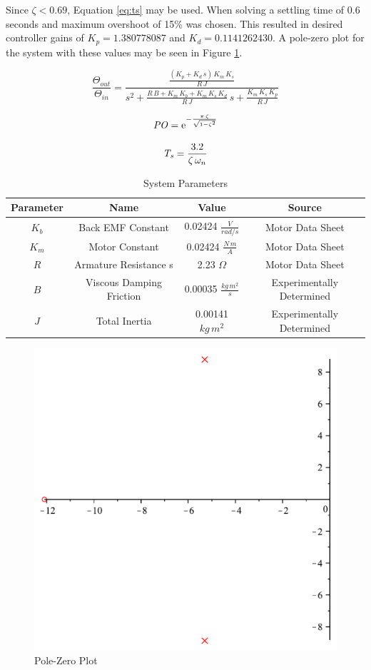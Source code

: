 Since $\zeta < 0.69$, Equation \ref{eq:ts} may be used.
When solving a settling time of 0.6 seconds and maximum overshoot of 15\% was chosen.
This resulted in desired controller gains of $K_p = 1.380778087$ and $ K_d = 0.1141262430 $.
A pole-zero plot for the system with these values may be seen in Figure \ref{fig:polezero}.

\begin{equation}
	\label{eq:systf}
	{\frac {\Theta_{out}}{\Theta_{in}}} = 
	{\frac 
		{\frac {\left( K_p +  K_d\,s \right)\,K_m\,K_s}{R\,J}}
		{s^{2} + {\frac {R\,B + K_m\,K_b + K_m\,K_s\,K_d}{R\,J}}\,s + {\frac {K_m\,K_s\,K_p}{R\,J}}}
	}
\end{equation}

\begin{equation}
	\label{eq:po}
	{\it PO}={{\rm e}^{-{\frac {\pi \,\zeta}{\sqrt {1-{\zeta}^{2}}}}}}
\end{equation}

\begin{equation}
	\label{eq:ts}
	{\it T_s} ={\frac {3.2}{\zeta\,\omega_n}}
\end{equation}

\begin{table}[htb]
	\centering
	\caption{System Parameters}
	\label{tbl:sysparams}
	\vspace{6pt}
	\footnotesize
	\begin{tabular}{cccc}
		\toprule
		Parameter & Name & Value & Source \\
		\midrule
		$K_b$ & Back EMF Constant & 0.02424 ${\frac {V}{rad/s}}$ & Motor Data Sheet \\
		$K_m$ & Motor Constant & 0.02424 ${\frac {N\,m}{A}}$ & Motor Data Sheet \\
		$R$ & Armature Resistance s& 2.23 $\Omega$ & Motor Data Sheet \\
		$B$ & Viscous Damping Friction & 0.00035 ${\frac {kg\,m^2}{s}}$ & Experimentally Determined \\
		$J$ & Total Inertia & 0.00141 $kg\,m^2$ & Experimentally Determined \\
		\bottomrule
	\end{tabular}
\end{table}

 \begin{figure}[ht]
    \centering
    \includegraphics[width=.50\textwidth]{images/PoleZero.pdf}
    \caption{Pole-Zero Plot}
    \label{fig:polezero}
\end{figure}


